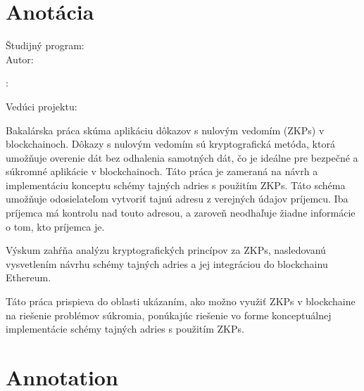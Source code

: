 \thispagestyle{empty}

\vspace*{\fill}

\section*{Anotácia}

\begin{minipage}[t]{1\columnwidth}
    \FIITuniversitySK

    \FIITfacultySK

    Študijný program: \FIITstudyProgramSK\\

    Autor: \FIITauthor

    \FIITthesisSK: \FIITtitleSK

    Vedúci projektu: \FIITsupervisor

    \FIITdateSK
\end{minipage}

\bigskip{}

Bakalárska práca skúma aplikáciu dôkazov s nulovým vedomím (ZKPs) v
blockchainoch. Dôkazy s nulovým vedomím sú kryptografická metóda, ktorá
umožňuje overenie dát bez odhalenia samotných dát, čo je ideálne pre bezpečné
a súkromné aplikácie v blockchainoch. Táto práca je zameraná na návrh
a implementáciu konceptu schémy tajných adries s použitím ZKPs. Táto schéma
umožňuje odosielateľom vytvoriť tajnú adresu z verejných údajov príjemcu.
Iba príjemca má kontrolu nad touto adresou, a zaroveň neodhaľuje žiadne informácie
o tom, kto príjemca je.

Výskum zahŕňa analýzu kryptografických princípov za ZKPs, nasledovanú
vysvetlením návrhu schémy tajných adries a jej integráciou do blockchainu Ethereum.

Táto práca prispieva do oblasti ukázaním, ako možno využiť ZKPs v blockchaine
na riešenie problémov súkromia, ponúkajúc riešenie vo forme konceptuálnej
implementácie schémy tajných adries s použitím ZKPs.

\newpage{}\thispagestyle{empty}\medskip{}

\emptypage

\thispagestyle{empty}

\vspace*{\fill}

\section*{Annotation}

